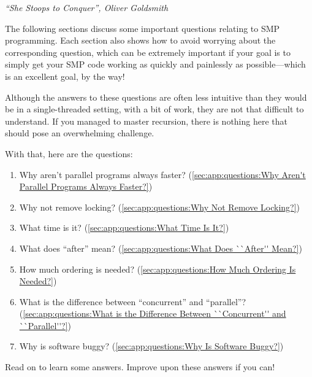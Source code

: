
%
	 {\emph{``She Stoops to Conquer'', Oliver Goldsmith}}

The following sections discuss some important questions relating to
SMP programming.
Each section also shows how to avoid worrying about
the corresponding question, which can be extremely important if
your goal is to simply get your SMP code working as quickly and
painlessly as possible---which is an excellent goal, by the way!

Although the answers to these questions are often less
intuitive than they would be in a single-threaded setting,
with a bit of work, they are not that difficult to understand.
If you managed to master recursion, there is nothing here that should
pose an overwhelming challenge.

With that, here are the questions:

\begin{enumerate}
\item	Why aren't parallel programs always faster?
	(\cref{sec:app:questions:Why Aren't Parallel Programs Always Faster?})
\item	Why not remove locking?
	(\cref{sec:app:questions:Why Not Remove Locking?})
\item	What time is it?
	(\cref{sec:app:questions:What Time Is It?})
\item	What does ``after'' mean?
	(\cref{sec:app:questions:What Does ``After'' Mean?})
\item	How much ordering is needed?
	(\cref{sec:app:questions:How Much Ordering Is Needed?})
\item	What is the difference between ``concurrent'' and ``parallel''?
	(\cref{sec:app:questions:What is the Difference Between ``Concurrent'' and ``Parallel''?})
\item	Why is software buggy?
	(\cref{sec:app:questions:Why Is Software Buggy?})
\end{enumerate}

Read on to learn some answers.
Improve upon these answers if you can!











